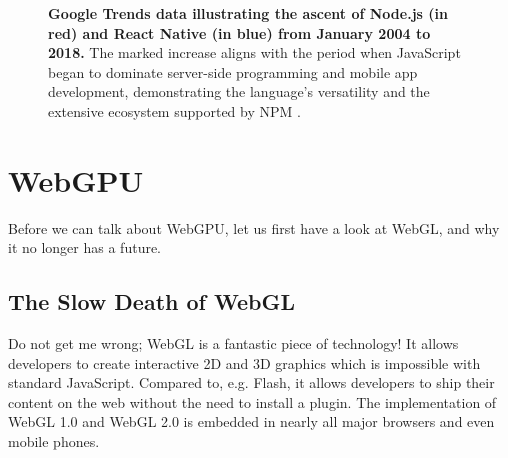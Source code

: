 \documentclass[10pt]{article}
\begin{document}
\begin{sloppypar}
  \begin{figure}[ht]
    \centering
    \caption[Google Trends data illustrating the ascent of Node.js and React Native.]{\textbf{Google Trends data illustrating the ascent of Node.js (in red) and React Native (in blue) from January 2004 to 2018.} The marked increase aligns with the period when JavaScript began to dominate server-side programming and mobile app development, demonstrating the language's versatility and the extensive ecosystem supported by NPM \citep{google_google_nodate}.}
    \label{fig:atwood-law}
  \end{figure}

  \section{WebGPU}
  \label{sec:webgpu}

  Before we can talk about WebGPU, let us first have a look at WebGL, and why it no longer has a future.

  \subsection{The Slow Death of WebGL}
  \label{subsec:the-slow-death-of-webgl}

  Do not get me wrong; WebGL is a fantastic piece of technology! It allows developers to create interactive 2D and 3D graphics which is impossible with standard JavaScript. Compared to, e.g. Flash, it allows developers to ship their content on the web without the need to install a plugin. The implementation of WebGL 1.0 and WebGL 2.0 is embedded in nearly all major browsers and even mobile phones.


\end{sloppypar}
\end{document}
